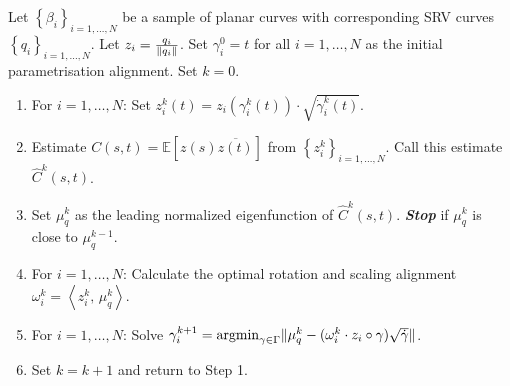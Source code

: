 \begin{algorithm}
  \label{algo:mean}
  Let $\left\{\beta_i\right\}_{i=1,\dots,N}$ be a sample of planar curves with corresponding SRV curves $\left\{ q_i \right\}_{i=1,\dots,N}$.
  Let $z_i = \frac{q_i}{\lVert q_i\rVert}$.
  Set $\gamma_i^0 = t$ for all $i=1,\dots,N$ as the initial parametrisation alignment.
  Set $k = 0$. 
  \begin{enumerate}
    \item For $i=1,\dots,N$: Set $z_i^k(t) = z_i\left(\gamma^k_i(t)\right) \cdot \sqrt{\dot\gamma_i^k(t)}$.
    \item Estimate $C(s,t) = \mathbb{E}[z(s)\overline{z(t)}]$ from $\left\{z_i^k\right\}_{i=1,\dots,N}$. Call this estimate $\hat{C}^k(s,t)$.
    \item Set $\mu_q^k$ as the leading normalized eigenfunction of $\hat{C}^k(s,t)$. \emph{\textbf{Stop}} if $\mu_q^k$ is close to $\mu_q^{k-1}$.
    \item For $i=1,\dots,N$: Calculate the optimal rotation and scaling alignment $\omega^k_i = \left\langle z_i^k,\, \mu_q^k \right\rangle$.
    \item For $i=1,\dots,N$: Solve $\gamma_i^{k+1} = \operatorname*{argmin}_{\gamma \in \Gamma} \lVert\mu_q^k - (\omega_i^k \cdot z_i \circ \gamma ) \sqrt{\dot\gamma}\rVert$.
    \item Set $k = k+1$ and return to Step 1.
  \end{enumerate}
\end{algorithm}

